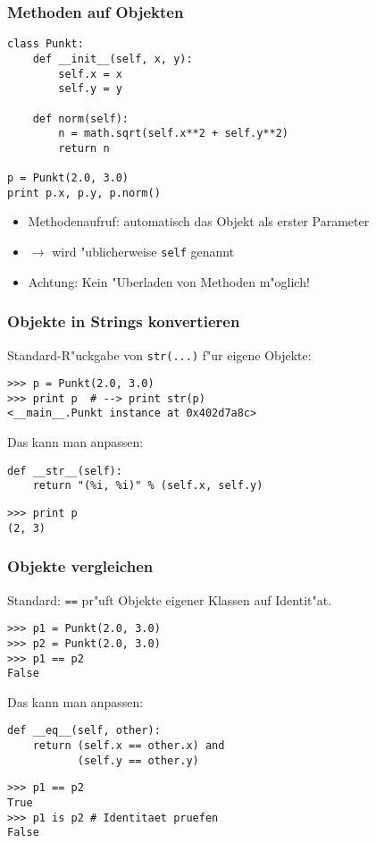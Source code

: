 \begin{frame}[fragile]
\frametitle{Methoden auf Objekten}
\begin{lstlisting}[style=Python]
class Punkt:
    def __init__(self, x, y):
        self.x = x
        self.y = y

    def norm(self):
        n = math.sqrt(self.x**2 + self.y**2)
        return n

p = Punkt(2.0, 3.0)
print p.x, p.y, p.norm()
\end{lstlisting}
\begin{itemize}
\item Methodenaufruf: automatisch das Objekt als erster Parameter
\item $\rightarrow$ wird "ublicherweise \texttt{self} genannt
\item\alert{Achtung}: Kein "Uberladen von Methoden m"oglich!
\end{itemize}
\end{frame}

\begin{frame}[fragile]
\frametitle{Objekte in Strings konvertieren}
Standard-R"uckgabe von \texttt{str(...)} f"ur eigene Objekte:
\begin{lstlisting}[style=Shell]
>>> p = Punkt(2.0, 3.0)
>>> print p  # --> print str(p)
<__main__.Punkt instance at 0x402d7a8c>
\end{lstlisting}
\vspace{2mm}

Das kann man anpassen:
\begin{lstlisting}[style=Python]
def __str__(self):
    return "(%i, %i)" % (self.x, self.y)
\end{lstlisting}
\begin{lstlisting}[style=Shell]
>>> print p
(2, 3)
 \end{lstlisting}
\end{frame}

\begin{frame}[fragile]
\frametitle{Objekte vergleichen}
Standard: \texttt{==} pr"uft Objekte eigener Klassen auf Identit"at.
\begin{lstlisting}[style=Shell]
>>> p1 = Punkt(2.0, 3.0)
>>> p2 = Punkt(2.0, 3.0)
>>> p1 == p2
False
\end{lstlisting}
\vspace{2mm}
Das kann man anpassen:
\begin{lstlisting}[style=Python]
def __eq__(self, other):
    return (self.x == other.x) and
           (self.y == other.y)
\end{lstlisting}
\begin{lstlisting}[style=Shell]
>>> p1 == p2
True
>>> p1 is p2 # Identitaet pruefen
False
\end{lstlisting}
\end{frame}

